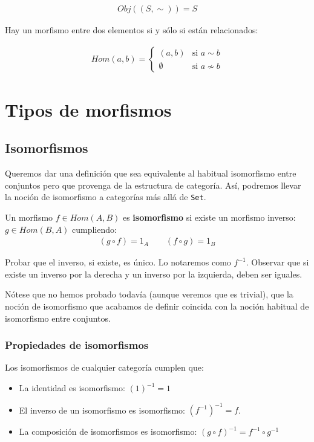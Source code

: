 \documentclass[11pt, fleqn, spanish]{book}
\newcommand{\twopartdef}[4]
{
  \left\{
    \begin{array}{ll}
      #1 & \mbox{si } #2 \\
      #3 & \mbox{si } #4
    \end{array}
  \right.
}
\begin{document}
\begin{gather*}
  Obj((S,\sim)) = S
\end{gather*}

Hay un morfismo entre dos elementos si y sólo si están relacionados:

\begin{align*}
  Hom(a,b)= \twopartdef{(a,b)}{a \sim b}{\emptyset}{a \nsim b}
\end{align*}





\chapter{Tipos de morfismos}

\section {Isomorfismos}
Queremos dar una definición que sea equivalente al habitual
isomorfismo entre conjuntos pero que provenga de la estructura de
categoría. Así, podremos llevar la noción de isomorfismo a categorías
más allá de \texttt{Set}.

\begin{definition}
  Un morfismo $f \in Hom(A,B)$ es \textbf{isomorfismo} si existe un morfismo inverso:
  $g \in Hom(B,A)$ cumpliendo:
  \begin{gather*}
    (g \circ f) = 1_A \qquad (f \circ g) = 1_B
  \end{gather*}
\end{definition}
  
\begin{exercise} 
  Probar que el inverso, si existe, es único. Lo notaremos como $f^{-1}$. Observar que si
  existe un inverso por la derecha y un inverso por la izquierda, deben ser iguales.
\end{exercise}

Nótese que no hemos probado todavía (aunque veremos que es trivial),
que la noción de isomorfismo que acabamos de definir coincida con la
noción habitual de isomorfismo entre conjuntos.


\subsection{Propiedades de isomorfismos}
\begin{theorem}
  Los isomorfismos de cualquier categoría cumplen que:
  
  \begin{itemize}
  \item La identidad es isomorfismo: $(1)^{-1} = 1$ 
  \item El inverso de un isomorfismo es isomorfismo: $(f^{-1})^{-1} = f$.
  \item La composición de isomorfismos es isomorfismo: $(g \circ f)^{-1} = f^{-1} \circ g^{-1}$
  \end{itemize}

\end{theorem}
\end{document}
